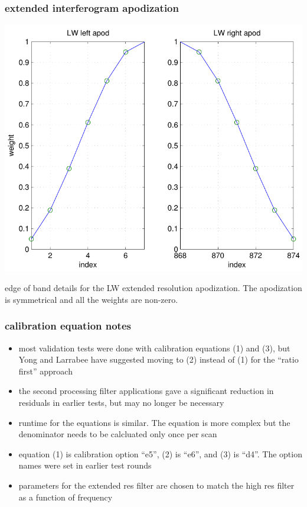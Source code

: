 \documentclass[11pt]{beamer}
\begin{document}
\begin{frame}
\frametitle{extended interferogram apodization}
\begin{center}
  \includegraphics[scale=0.5]{figures/apod_LW.pdf}
\end{center}
edge of band details for the LW extended resolution apodization.
The apodization is symmetrical and all the weights are non-zero.
\end{frame}
\begin{frame}
\frametitle{calibration equation notes}

\begin{itemize}
  \item most {\ccast} validation tests were done with calibration
    equations (1) and (3), but Yong and Larrabee have suggested
    moving to (2) instead of (1) for the ``ratio first'' approach

  \item the second processing filter applications gave a significant
    reduction in residuals in earlier tests, but may no longer be
    necessary

  \item runtime for the equations is similar.  The {\noaa} equation 
    is more complex but the denominator needs to be calcluated only
    once per scan

  \item equation (1) is {\ccast} calibration option ``e5'', (2) is
    ``e6'', and (3) is ``d4''.  The {\ccast} option names were set
    in earlier test rounds

  \item parameters for the {\umbc} extended res {\atbd} filter are
    chosen to match the {\noaa} high res filter as a function of
    frequency

\end{itemize}

\end{frame}
\end{document}
